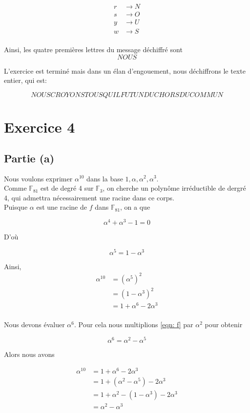 \documentclass[12pt]{article}
\begin{document}
\begin{align*}
    r & \to N \\
    s & \to O \\
    y & \to U \\
    w & \to S \\
\end{align*}

Ainsi, les quatre premières lettres du message déchiffré sont
$$NOUS$$

L'exercice est terminé mais dans un élan d'engouement, nous déchiffrons le texte entier, qui est:

$$NOUSCROYONSTOUSQUILFUTUNDUCHORSDUCOMMUN$$

\section{Exercice 4}
\subsection{Partie (a)}

Nous voulons exprimer $\alpha^{10}$ dans la base $1, \alpha, \alpha^2, \alpha^3$. \\
Comme $\mathbb{F}_{81}$ est de degré 4 sur $\mathbb{F}_{3}$, on cherche un polynôme irréductible de dergré 4, qui admettra nécessairement une racine dans ce corps. \\
Puisque $\alpha$ est une racine de $f$ dans $\mathbb{F}_{81}$, on a que

\begin{equation}
    \label{eqn: f}
    \alpha^4 + \alpha^3 - 1 = 0
\end{equation}


D'où

$$\alpha^5 = 1 - \alpha^3$$

Ainsi,
\begin{align*}
    \alpha^{10} & = \left( \alpha^{5} \right)^2   \\
                & = \left( 1 - \alpha^3 \right)^2 \\
                & = 1 + \alpha^6 - 2 \alpha^3     \\
\end{align*}

Nous devons évaluer $\alpha^6$. Pour cela nous multiplions \eqref{eqn: f} par $\alpha^2$ pour obtenir

$$\alpha^6 = \alpha^2 - \alpha^5$$

Alors nous avons

\begin{align*}
    \alpha^{10} & = 1 + \alpha^6 - 2 \alpha^3            \\
                & = 1 + (\alpha^2 - \alpha^5) - 2 \alpha^3 \\
                & = 1 + \alpha^2 - (1 - \alpha^3) - 2 \alpha^3 \\
                & = \alpha^2 - \alpha^3 \\
\end{align*}
\end{document}
